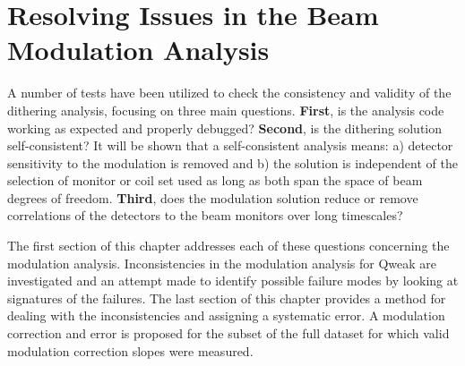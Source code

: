 
\chapter{Resolving Issues in the Beam Modulation Analysis}
\captionsetup{justification=justified,singlelinecheck=false}

\label{Ch:BMod_correction}

A number of tests have been utilized to check the consistency and validity of the dithering analysis, focusing on three main questions. {\bf First}, is the analysis code working as expected and properly debugged? {\bf Second}, is the dithering solution self-consistent? It will be shown that a self-consistent analysis means: a) detector sensitivity to the modulation is removed and  b) the solution is independent of the selection of monitor or coil set used as long as both span the space of beam degrees of freedom. {\bf Third}, does the modulation solution reduce or remove correlations of the detectors to the beam monitors over long timescales?  

The first section of this chapter addresses each of these questions concerning the modulation analysis. Inconsistencies in the modulation analysis for Qweak are investigated and an attempt made to identify possible failure modes by looking at signatures of the failures. The last section of this chapter provides a method for dealing with the inconsistencies and assigning a systematic error. A  modulation correction and error is proposed for the subset of the full \Qs dataset for which valid modulation correction slopes were measured.

